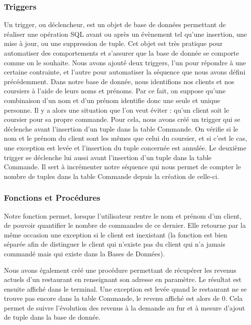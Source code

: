 \documentclass[french]{article}
\begin{document}
            \subsubsection*{Triggers}
            Un trigger, ou déclencheur, est un objet de base de données permettant de réaliser une opération SQL avant ou après un évènement tel qu'une insertion, une mise à jour, ou une suppression de tuple. Cet objet est très pratique pour automatiser des comportements et s'assurer que la base de donnée se comporte comme on le souhaite.\newline
            Nous avons ajouté deux triggers, l'un pour répondre à une certaine contrainte, et l'autre pour automatiser la séquence que nous avons défini précédemment.
            Dans notre base de donnée, nous identifions nos clients et nos coursiers à l'aide de leurs noms et prénoms. Par ce fait, on suppose qu'une combinaison d'un nom et d'un prénom identifie donc une seule et unique personne. Il y a alors une situation que l'on veut éviter : qu'un client soit le coursier pour sa propre commande. Pour cela, nous avons créé un trigger qui se déclenche avant l'insertion d'un tuple dans la table Commande. On vérifie si le nom et le prénom du client sont les mêmes que celui du coursier, et si c'est le cas, une exception est levée et l'insertion du tuple concernée est annulée.
            Le deuxième trigger se déclenche lui aussi avant l'insertion d'un tuple dans la table Commande. Il sert à incrémenter notre séquence qui nous permet de compter le nombre de tuples dans la table Commande depuis la création de celle-ci.\newpage
            
            \subsubsection*{Fonctions et Procédures}
            Notre fonction permet, lorsque l'utilisateur rentre le nom et prénom d'un client, de pouvoir quantifier le nombre de commandes de ce dernier.
            Elle retourne par la même occasion une exception si le client est inexistant (la fonction est bien séparée afin de distinguer le client qui n'existe pas du client qui n'a jamais commandé mais qui existe dans la Bases de Données).\medskip

            Nous avons également créé une procédure permettant de récupérer les revenus actuels d'un restaurant en renseignant son adresse en paramètre. Le résultat est ensuite affiché dans le terminal. Une exception est levée quand le restaurant ne se trouve pas encore dans la table Commande, le revenu affiché est alors de 0. Cela permet de suivre l'évolution des revenus à la demande au fur et à mesure d'ajout de tuple dans la base de donnée.
            
\end{document}
